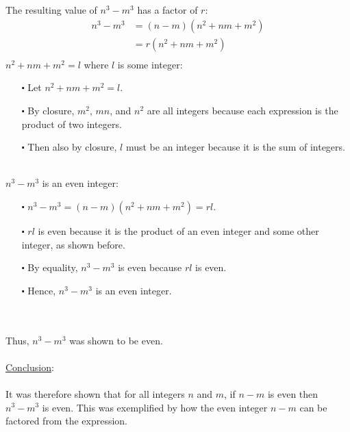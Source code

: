 \documentclass[12pt]{article}
\begin{document}
\newblock
\\ \\
The resulting value of $n^3-m^3$ has a factor of $r$: 
\begin{align*}
  n^3-m^3 &= (n-m)(n^2+nm+m^2)\\
  &= r(n^2+nm+m^2)\\
\end{align*}
 $n^2+nm+m^2 = l$ where $l$ is some integer:
\begin{itemize}
  \item [$\centerdot$] Let $n^2+nm+m^2 = l$.
  \item [$\centerdot$] By closure, $m^2$, $mn$, and $n^2$ are all integers because each expression is the product of two integers.
  \item [$\centerdot$] Then also by closure, $l$ must be an integer because it is the sum of integers.
\end{itemize}
\newblock
\\
$n^3-m^3$ is an even integer:
\begin{itemize}
  \item [$\centerdot$] $n^3-m^3 = (n-m)(n^2+nm+m^2) = rl$.
  \item [$\centerdot$] $rl$ is even because it is the product of an even integer and some other integer, as shown before.
  \item [$\centerdot$] By equality, $n^3-m^3$ is even because $rl$ is even.
  \item [$\centerdot$] Hence, $n^3-m^3$ is an even integer.
\end{itemize}
\newblock
\\ \\
Thus, $n^3-m^3$ was shown to be even.
\\ \\
\underline{Conclusion}:
\\ \\
It was therefore shown that for all integers $n$ and $m$, if $n - m$ is even then $n^3 - m^3$ is even.
This was exemplified by how the even integer $n-m$ can be factored from the expression. 
\end{document}
